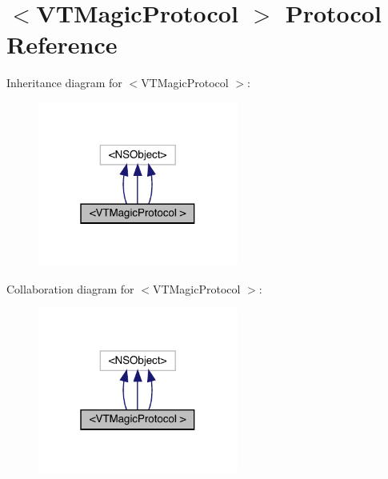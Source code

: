 \hypertarget{protocol_v_t_magic_protocol_01-p}{}\section{$<$V\+T\+Magic\+Protocol $>$ Protocol Reference}
\label{protocol_v_t_magic_protocol_01-p}


Inheritance diagram for $<$V\+T\+Magic\+Protocol $>$\+:\nopagebreak
\begin{figure}[H]
\begin{center}
\leavevmode
\includegraphics[width=187pt]{protocol_v_t_magic_protocol_01-p__inherit__graph}
\end{center}
\end{figure}


Collaboration diagram for $<$V\+T\+Magic\+Protocol $>$\+:\nopagebreak
\begin{figure}[H]
\begin{center}
\leavevmode
\includegraphics[width=187pt]{protocol_v_t_magic_protocol_01-p__coll__graph}
\end{center}
\end{figure}
